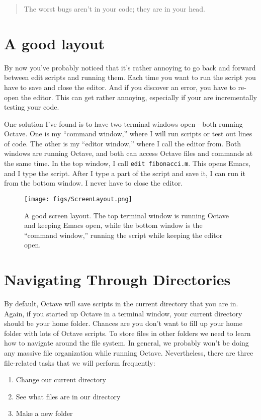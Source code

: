 \begin{quote}
The worst bugs aren't in your code; they are in your head.
\end{quote}

\section{A good layout}

By now you've probably noticed that it's rather annoying to go back and forward
between edit scripts and running them. Each time you want to run the script you
have to save and close the editor. And if you discover an error, you have to
re-open the editor. This can get rather annoying, especially if your are
incrementally testing your code.

One solution I've found is to have two terminal windows open - both running
Octave. One is my ``command window,'' where I will run scripts or test out
lines of code. The other is my ``editor window,'' where I call the editor from.
Both windows are running Octave, and both can access Octave files and
commands at the same time. In the top window, I call {\tt edit fibonacci.m}.
This opens Emacs, and I type the script. After I type a part of the script and
save it, I can run it from the bottom window. I never have to close the editor.

\begin{figure}
 \centerline{\texttt{[image: figs/ScreenLayout.png]}}
 \caption{A good screen layout. The top terminal window is running Octave and
keeping Emacs open, while the bottom window is the ``command window,'' running
the script while keeping the editor open.}
\end{figure}

\section{Navigating Through Directories}

By default, Octave will save scripts in the current directory that you are in.
Again, if you started up Octave in a terminal window, your current
directory should be your home folder. Chances are you don't want to fill up
your home folder with lots of Octave scripts. To store files in other folders
we need to learn how to navigate around the file system.
In general, we probably won't be doing any massive file organization
while running Octave. Nevertheless, there are three file-related tasks that
we will perform frequently:
%
\begin{enumerate}
 \item Change our current directory
 \item See what files are in our directory
 \item Make a new folder
\end{enumerate}

